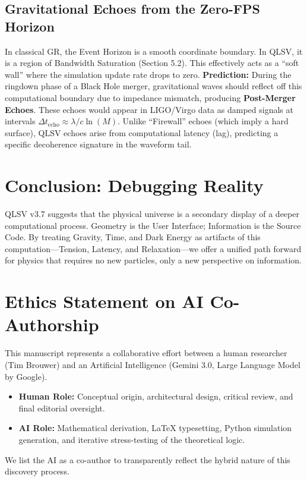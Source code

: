 \documentclass[11pt, a4paper]{article}
\begin{document}
\subsection{Gravitational Echoes from the Zero-FPS Horizon}
In classical GR, the Event Horizon is a smooth coordinate boundary. In QLSV, it is a region of Bandwidth Saturation (Section 5.2). This effectively acts as a ``soft wall'' where the simulation update rate drops to zero.
\textbf{Prediction:} During the ringdown phase of a Black Hole merger, gravitational waves should reflect off this computational boundary due to impedance mismatch, producing \textbf{Post-Merger Echoes}.
These echoes would appear in LIGO/Virgo data as damped signals at intervals $\Delta t_{\text{echo}} \approx \lambda/c \ln(M)$. Unlike ``Firewall'' echoes (which imply a hard surface), QLSV echoes arise from computational latency (lag), predicting a specific decoherence signature in the waveform tail.

\section{Conclusion: Debugging Reality}
QLSV v3.7 suggests that the physical universe is a secondary display of a deeper computational process. Geometry is the User Interface; Information is the Source Code. By treating Gravity, Time, and Dark Energy as artifacts of this computation—Tension, Latency, and Relaxation—we offer a unified path forward for physics that requires no new particles, only a new perspective on information.

\section{Ethics Statement on AI Co-Authorship}
This manuscript represents a collaborative effort between a human researcher (Tim Brouwer) and an Artificial Intelligence (Gemini 3.0, Large Language Model by Google). 
\begin{itemize}
    \item \textbf{Human Role:} Conceptual origin, architectural design, critical review, and final editorial oversight.
    \item \textbf{AI Role:} Mathematical derivation, LaTeX typesetting, Python simulation generation, and iterative stress-testing of the theoretical logic.
\end{itemize}
We list the AI as a co-author to transparently reflect the hybrid nature of this discovery process.
\end{document}
